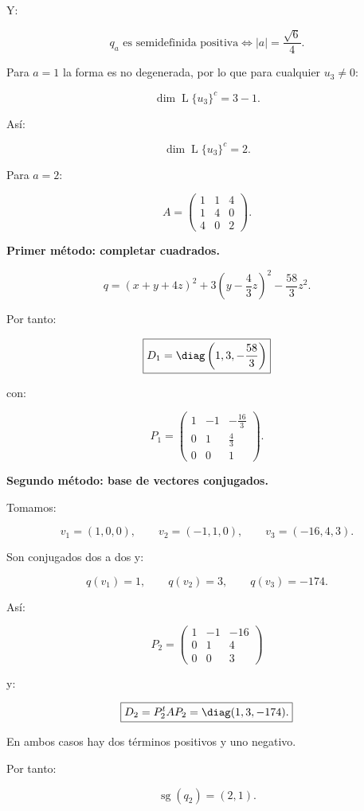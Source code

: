 \documentclass[11pt,a4paper]{article}
\newcommand{\sg}{\operatorname{sg}}
\newcommand{\Span}{\operatorname{L}}
\begin{document}
Y:

\[
\boxed{
q_a\text{ es semidefinida positiva}
\iff
|a|=\frac{\sqrt6}{4}.
}
\]

Para $a=1$ la forma es no degenerada, por lo que para cualquier $u_3\neq0$:

\[
\dim\Span\{u_3\}^c
=
3-1.
\]

Así:

\[
\boxed{
\dim\Span\{u_3\}^c=2.
}
\]

Para $a=2$:

\[
A=
\begin{pmatrix}
1&1&4\\
1&4&0\\
4&0&2
\end{pmatrix}.
\]

\textbf{Primer método: completar cuadrados.}

\[
q
=
(x+y+4z)^2
+
3\left(y-\frac43z\right)^2
-
\frac{58}{3}z^2.
\]

Por tanto:

\[
\boxed{
D_1=
\diag\left(1,3,-\frac{58}{3}\right)
}
\]

con:

\[
\boxed{
P_1=
\begin{pmatrix}
1&-1&-\frac{16}{3}\\
0&1&\frac43\\
0&0&1
\end{pmatrix}.
}
\]

\textbf{Segundo método: base de vectores conjugados.}

Tomamos:

\[
v_1=(1,0,0),
\qquad
v_2=(-1,1,0),
\qquad
v_3=(-16,4,3).
\]

Son conjugados dos a dos y:

\[
q(v_1)=1,
\qquad
q(v_2)=3,
\qquad
q(v_3)=-174.
\]

Así:

\[
\boxed{
P_2=
\begin{pmatrix}
1&-1&-16\\
0&1&4\\
0&0&3
\end{pmatrix}
}
\]

y:

\[
\boxed{
D_2=P_2^tAP_2
=
\diag(1,3,-174).
}
\]

En ambos casos hay dos términos positivos y uno negativo.

Por tanto:

\[
\boxed{
\sg(q_2)=(2,1).
}
\]
\end{document}
